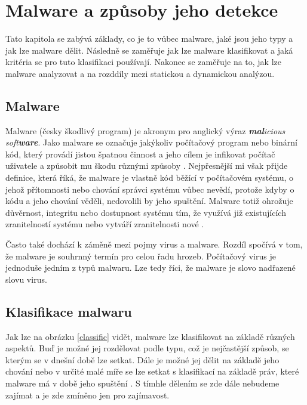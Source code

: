 \chapter{Malware a způsoby jeho detekce} \label{2.chap}

Tato kapitola se zabývá základy, co je to vůbec malware, jaké jsou jeho typy a jak lze malware dělit. Následně se zaměřuje jak lze malware klasifikovat a jaká kritéria se pro tuto klasifikaci používají.
Nakonec se zaměřuje na to, jak lze malware analyzovat a na rozddíly mezi statickou a dynamickou analýzou. 


\section{Malware}
Malware (česky škodlivý program) je akronym pro anglický výraz \textit{\textbf{mal}icious soft\textbf{ware}}. Jako malware se označuje jakýkoliv počítačový program nebo binární kód, který provádí jistou 
špatnou činnost a jeho cílem je infikovat počítač uživatele a způsobit mu škodu různými způsoby \cite{malware_book}. %
Nejpřesnější mi však přijde definice, která říká, že malware je vlastně kód běžící v počítačovém systému, o jehož přítomnosti nebo chování správci systému vůbec nevědí, protože kdyby o kódu a jeho chování věděli, nedovolili by jeho spuštění.
Malware totiž ohrožuje důvěrnost, integritu nebo dostupnost systému tím, že využívá již existujících zranitelností systému nebo vytváří zranitelnosti nové \cite{article_malware}.%

Často také dochází k záměně mezi pojmy virus a malware. Rozdíl spočívá v tom, že malware je souhrnný termín pro celou řadu hrozeb. Počítačový virus je jednoduše jedním z typů malwaru. Lze tedy říci, že malware je slovo nadřazené slovu virus.

\section{Klasifikace malwaru}
Jak lze na obrázku \ref{classific} vidět, malware lze klasifikovat na základě různých aspektů. Buď je možné jej rozdělovat podle typu, což je nejčastější způsob, se kterým se v dnešní době lze setkat. 
Dále je možné jej dělit na základě jeho chování nebo v určité malé míře se lze setkat s klasifikací na základě práv, které malware má v době jeho spuštění \cite{article_malware}. 
S tímhle dělením se zde dále nebudeme zajímat a je zde zmíněno jen pro zajímavost.

